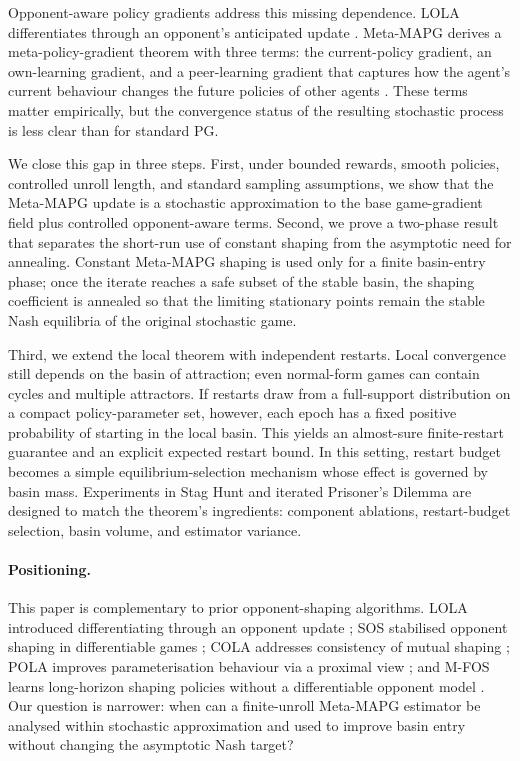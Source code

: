 \documentclass{article}
\theoremstyle{plain}
\theoremstyle{definition}
\theoremstyle{remark}
\begin{document}
Opponent-aware policy gradients address this missing dependence. LOLA differentiates through an opponent's anticipated update \citep{foerster2018lola,letcher2019stable}. Meta-MAPG derives a meta-policy-gradient theorem with three terms: the current-policy gradient, an own-learning gradient, and a peer-learning gradient that captures how the agent's current behaviour changes the future policies of other agents \citep{kim2021meta}. These terms matter empirically, but the convergence status of the resulting stochastic process is less clear than for standard PG.

We close this gap in three steps. First, under bounded rewards, smooth policies, controlled unroll length, and standard sampling assumptions, we show that the Meta-MAPG update is a stochastic approximation to the base game-gradient field plus controlled opponent-aware terms. Second, we prove a two-phase result that separates the short-run use of constant shaping from the asymptotic need for annealing. Constant Meta-MAPG shaping is used only for a finite basin-entry phase; once the iterate reaches a safe subset of the stable basin, the shaping coefficient is annealed so that the limiting stationary points remain the stable Nash equilibria of the original stochastic game.

Third, we extend the local theorem with independent restarts. Local convergence still depends on the basin of attraction; even normal-form games can contain cycles and multiple attractors. If restarts draw from a full-support distribution on a compact policy-parameter set, however, each epoch has a fixed positive probability of starting in the local basin. This yields an almost-sure finite-restart guarantee and an explicit expected restart bound. In this setting, restart budget becomes a simple equilibrium-selection mechanism whose effect is governed by basin mass. Experiments in Stag Hunt and iterated Prisoner's Dilemma are designed to match the theorem's ingredients: component ablations, restart-budget selection, basin volume, and estimator variance.

\paragraph{Positioning.}
This paper is complementary to prior opponent-shaping algorithms. LOLA introduced differentiating through an opponent update \citep{foerster2018lola}; SOS stabilised opponent shaping in differentiable games \citep{letcher2019stable}; COLA addresses consistency of mutual shaping \citep{willi2022cola}; POLA improves parameterisation behaviour via a proximal view \citep{zhao2022pola}; and M-FOS learns long-horizon shaping policies without a differentiable opponent model \citep{lu2022mfos}. Our question is narrower: when can a finite-unroll Meta-MAPG estimator be analysed within stochastic approximation and used to improve basin entry without changing the asymptotic Nash target?
\end{document}
